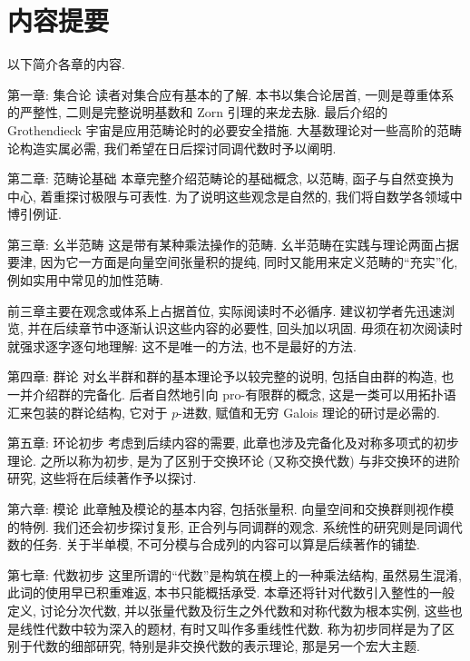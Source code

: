 \section*{内容提要}
以下简介各章的内容.

\begin{asparadesc}
	\item[第一章: 集合论] 读者对集合应有基本的了解. 本书以集合论居首, 一则是尊重体系的严整性, 二则是完整说明基数和 Zorn 引理的来龙去脉. 最后介绍的 Grothendieck 宇宙是应用范畴论时的必要安全措施. 大基数理论对一些高阶的范畴论构造实属必需, 我们希望在日后探讨同调代数时予以阐明.
	
	\item[第二章: 范畴论基础] 本章完整介绍范畴论的基础概念, 以范畴, 函子与自然变换为中心, 着重探讨极限与可表性. 为了说明这些观念是自然的, 我们将自数学各领域中博引例证.
	
	\item[第三章: 幺半范畴] 这是带有某种乘法操作的范畴. 幺半范畴在实践与理论两面占据要津, 因为它一方面是向量空间张量积的提纯, 同时又能用来定义范畴的``充实''化, 例如实用中常见的加性范畴.

	前三章主要在观念或体系上占据首位, 实际阅读时不必循序. 建议初学者先迅速浏览, 并在后续章节中逐渐认识这些内容的必要性, 回头加以巩固. 毋须在初次阅读时就强求逐字逐句地理解: 这不是唯一的方法, 也不是最好的方法.

	\item[第四章: 群论] 对幺半群和群的基本理论予以较完整的说明, 包括自由群的构造, 也一并介绍群的完备化. 后者自然地引向 pro-有限群的概念, 这是一类可以用拓扑语汇来包装的群论结构, 它对于 $p$-进数, 赋值和无穷 Galois 理论的研讨是必需的.
	
	\item[第五章: 环论初步] 考虑到后续内容的需要, 此章也涉及完备化及对称多项式的初步理论. 之所以称为初步, 是为了区别于交换环论 (又称交换代数) 与非交换环的进阶研究, 这些将在后续著作予以探讨.
	
	\item[第六章: 模论] 此章触及模论的基本内容, 包括张量积. 向量空间和交换群则视作模的特例. 我们还会初步探讨复形, 正合列与同调群的观念. 系统性的研究则是同调代数的任务. 关于半单模, 不可分模与合成列的内容可以算是后续著作的铺垫.
	
	\item[第七章: 代数初步] 这里所谓的``代数''是构筑在模上的一种乘法结构, 虽然易生混淆, 此词的使用早已积重难返, 本书只能概括承受. 本章还将针对代数引入整性的一般定义, 讨论分次代数, 并以张量代数及衍生之外代数和对称代数为根本实例, 这些也是线性代数中较为深入的题材, 有时又叫作多重线性代数. 称为初步同样是为了区别于代数的细部研究, 特别是非交换代数的表示理论, 那是另一个宏大主题.
	

\end{asparadesc}

